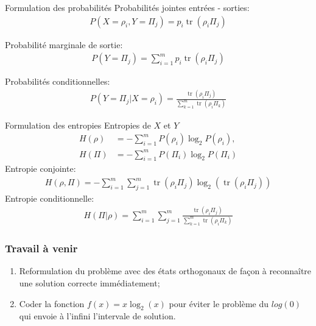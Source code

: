 \documentclass{beamer}
\DeclareMathOperator{\tr}{tr}
\begin{document}
\begin{frame}
    \begin{block}{Formulation des probabilités}
        Probabilités jointes entrées - sorties:
        \begin{align}
            P(X = \rho_i, Y = \Pi_j) = p_i \tr(\rho_i \Pi_j)
        \end{align}

        Probabilité marginale de sortie:
        \begin{align}
            P(Y = \Pi_j) = \displaystyle \sum_{i=1}^{m} p_i \tr (\rho_i \Pi_j)
        \end{align}

        Probabilités conditionnelles:
        \begin{align}
            P(Y = \Pi_j | X = \rho_i) = \frac{\tr(\rho_i \Pi_j)}{\displaystyle \sum_{k=1}^{m} \tr (\rho_i \Pi_k)}
        \end{align}
    \end{block}
\end{frame}

\begin{frame}
    \begin{block}{Formulation des entropies}
        \small
        Entropies de $X$ et $Y$
        \begin{align}
            H(\rho) &= - \displaystyle \sum_{i=1}^{m} P(\rho_i) \log_2 P(\rho_i), \\
            H(\Pi) &= - \displaystyle \sum_{i=1}^{m} P(\Pi_i) \log_2 P(\Pi_i)
        \end{align}
        Entropie conjointe:
        \begin{align}
            H(\rho, \Pi) = - \displaystyle \sum_{i=1}^{m} \displaystyle \sum_{j=1}^{m} \tr(\rho_i \Pi_j ) \log_2( \tr(\rho_i \Pi_j) )
        \end{align}
        Entropie conditionnelle:
        \begin{align}
            H(\Pi | \rho) = \displaystyle \sum_{i=1}^{m} \displaystyle \sum_{j=1}^{m} \frac{\tr(\rho_i \Pi_j)}{\displaystyle \sum_{k=1}^{m} \tr (\rho_i \Pi_k)}
        \end{align}
    \end{block}
\end{frame}

\begin{frame}
    \frametitle{Travail à venir}

    \begin{enumerate}
        \item Reformulation du problème avec des états orthogonaux de façon à reconnaître une solution correcte immédiatement;
        \item Coder la fonction $f(x) = x \log_2(x)$ pour éviter le problème du $log(0)$ qui envoie à l'infini l'intervale de solution.
    \end{enumerate}

\end{frame}
\end{document}
